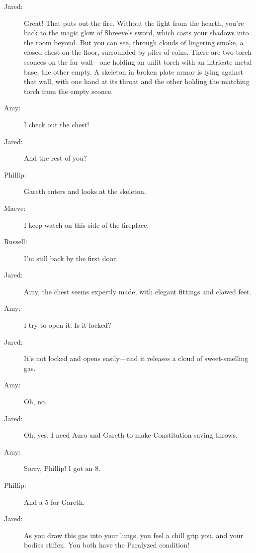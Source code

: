 \documentclass[10pt,a4paper,twoside,bg=print,twocolumn,openany,nodeprecatedcode]{dndbook}
\begin{document}
{\par \vspace { 9pt plus 3pt minus 3pt } \noindent  {} \nopagebreak }

\begin{description}
\item[Jared:]
Great! That puts out the fire. Without the light from the hearth, you're back to the magic glow of Shreeve's sword, which casts your shadows into the room beyond. But you can see, through clouds of lingering smoke, a closed chest on the floor, surrounded by piles of coins. There are two torch sconces on the far wall—one holding an unlit torch with an intricate metal base, the other empty. A skeleton in broken plate armor is lying against that wall, with one hand at its throat and the other holding the matching torch from the empty sconce.
\end{description}


\begin{description}
\item[Amy:]
I check out the chest!
\item[Jared:]
And the rest of you?
\item[Phillip:]
Gareth enters and looks at the skeleton.
\item[Maeve:]
I keep watch on this side of the fireplace.
\item[Russell:]
I'm still back by the first door.
\item[Jared:]
Amy, the chest seems expertly made, with elegant fittings and clawed feet.
\end{description}

{\par \vspace { 9pt plus 3pt minus 3pt } \noindent  {} \nopagebreak }

\begin{description}
\item[Amy:]
I try to open it. Is it locked?
\item[Jared:]
It's not locked and opens easily—and it releases a cloud of sweet-smelling gas.
\item[Amy:]
Oh, no.
\item[Jared:]
Oh, yes. I need Auro and Gareth to make Constitution saving throws.
\item[Amy:]
Sorry, Phillip! I got an 8.
\item[Phillip:]
And a 5 for Gareth.
\item[Jared:]
As you draw this gas into your lungs, you feel a chill grip you, and your bodies stiffen. You both have the Paralyzed condition!
\end{description}
\end{document}
